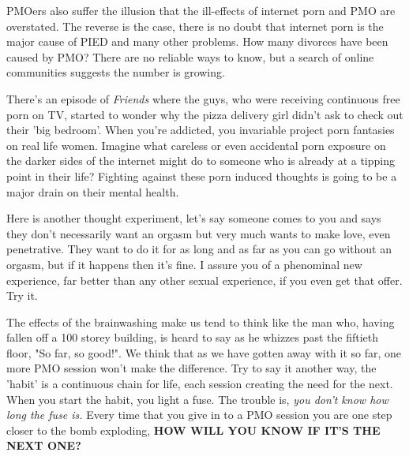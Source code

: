 PMOers also suffer the illusion that the ill-effects of internet porn and PMO are overstated. The reverse is the case, there is no doubt that internet porn is the major cause of PIED and many other problems. How many divorces have been caused by PMO? There are no reliable ways to know, but a search of online communities suggests the number is growing.

There's an episode of \textit{Friends} where the guys, who were receiving continuous free porn on TV, started to wonder why the pizza delivery girl didn't ask to check out their 'big bedroom'. When you're addicted, you invariable project porn fantasies on real life women. Imagine what careless or even accidental porn exposure on the darker sides of the internet might do to someone who is already at a tipping point in their life? Fighting against these porn induced thoughts is going to be a major drain on their mental health.

Here is another thought experiment, let's say someone comes to you and says they don't necessarily want an orgasm but very much wants to make love, even penetrative. They want to do it for as long and as far as you can go without an orgasm, but if it happens then it's fine. I assure you of a phenominal new experience, far better than any other sexual experience, if you even get that offer. Try it.

The effects of the brainwashing make us tend to think like the man who, having fallen off a 100 storey building, is heard to say as he whizzes past the fiftieth floor, "So far, so good!". We think that as we have gotten away with it so far, one more PMO session won't make the difference. Try to say it another way, the 'habit' is a continuous chain for life, each session creating the need for the next. When you start the habit, you light a fuse. The trouble is, \textit{you don't know how long the fuse is.} Every time that you give in to a PMO session you are one step closer to the bomb exploding, \textbf{HOW WILL YOU KNOW IF IT'S THE NEXT ONE?}
